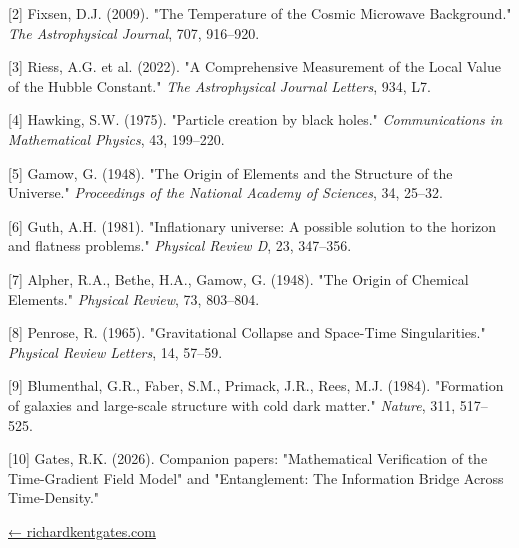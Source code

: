 \documentclass[
  10pt,
]{article}
\begin{document}
{[}2{]} Fixsen, D.J. (2009). "The Temperature of the Cosmic Microwave
Background." \emph{The Astrophysical Journal}, 707, 916--920.

{[}3{]} Riess, A.G. et al. (2022). "A Comprehensive Measurement of the
Local Value of the Hubble Constant." \emph{The Astrophysical Journal
Letters}, 934, L7.

{[}4{]} Hawking, S.W. (1975). "Particle creation by black holes."
\emph{Communications in Mathematical Physics}, 43, 199--220.

{[}5{]} Gamow, G. (1948). "The Origin of Elements and the Structure of
the Universe." \emph{Proceedings of the National Academy of Sciences},
34, 25--32.

{[}6{]} Guth, A.H. (1981). "Inflationary universe: A possible solution
to the horizon and flatness problems." \emph{Physical Review D}, 23,
347--356.

{[}7{]} Alpher, R.A., Bethe, H.A., Gamow, G. (1948). "The Origin of
Chemical Elements." \emph{Physical Review}, 73, 803--804.

{[}8{]} Penrose, R. (1965). "Gravitational Collapse and Space-Time
Singularities." \emph{Physical Review Letters}, 14, 57--59.

{[}9{]} Blumenthal, G.R., Faber, S.M., Primack, J.R., Rees, M.J. (1984).
"Formation of galaxies and large-scale structure with cold dark matter."
\emph{Nature}, 311, 517--525.

{[}10{]} Gates, R.K. (2026). Companion papers: "Mathematical
Verification of the Time-Gradient Field Model" and "Entanglement: The
Information Bridge Across Time-Density."

\href{https://richardkentgates.com/}{← richardkentgates.com}
\end{document}
